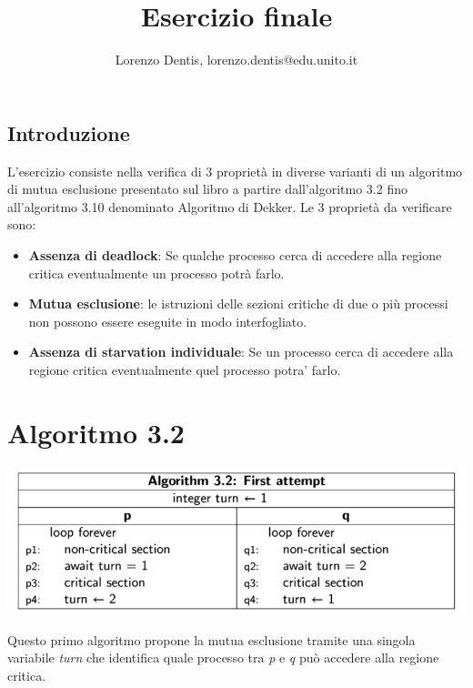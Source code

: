 \documentclass[a4paper]{article}
\begin{document}
\author{Lorenzo Dentis, lorenzo.dentis@edu.unito.it}
\title{Esercizio finale}
\maketitle

\subsection{Introduzione}
L’esercizio consiste nella verifica di 3 proprietà in diverse varianti di un algoritmo di mutua esclusione presentato sul libro a partire dall’algoritmo 3.2 fino all’algoritmo 3.10 denominato Algoritmo di Dekker.
Le 3 proprietà da verificare sono:
\begin{itemize}
	\item \textbf{Assenza di deadlock}: Se qualche processo cerca di accedere alla regione critica eventualmente un processo potrà farlo.
	\item \textbf{Mutua esclusione}:  le istruzioni delle sezioni critiche di due o più processi non possono essere eseguite in modo interfogliato.
	\item \textbf{Assenza di starvation individuale}: Se un processo cerca di accedere alla regione critica eventualmente quel processo potra' farlo.
\end{itemize}

\section{Algoritmo 3.2}
\label{SEC:3.2}
\begin{center}\includegraphics[width=1\textwidth]{3.2.png}\end{center}
Questo primo algoritmo propone la mutua esclusione tramite una singola variabile \textit{turn} che identifica quale processo tra \textit{p} e \textit{q} può accedere alla regione critica.
\newpage
\end{document}
